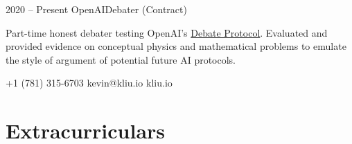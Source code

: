 \documentclass[paper=letter]{tccv}
\begin{document}
\begin{eventlist}
    \item{2020 -- Present}
         {OpenAI}{Debater (Contract)}

    Part-time honest debater testing OpenAI's
    \href{https://www.alignmentforum.org/posts/Br4xDbYu4Frwrb64a/writeup-progress-on-ai-safety-via-debate-1}{Debate
    Protocol}. Evaluated and provided evidence on conceptual physics and
    mathematical problems to emulate the style of argument of potential future
    AI protocols.
\end{eventlist}

 {+1 (781) 315-6703} {kevin@kliu.io} {kliu.io}

\section{Extracurriculars}
\end{document}
